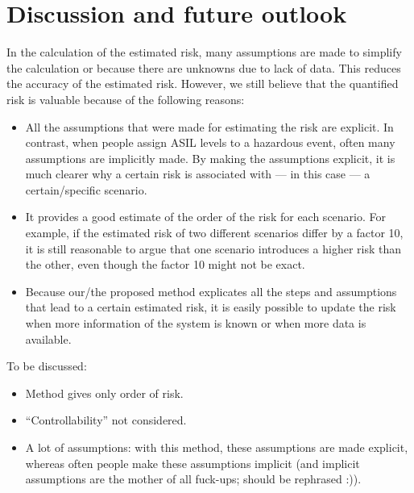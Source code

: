 \section{Discussion and future outlook} %
\label{sec:discussion}

In the calculation of the estimated risk, many assumptions are made to simplify the calculation or because there are unknowns due to lack of data. This reduces the accuracy of the estimated risk. 
However, we still believe that the quantified risk is valuable because of the following reasons:
\begin{itemize}
	\item All the assumptions that were made for estimating the risk are explicit. In contrast, when people assign ASIL levels to a hazardous event, often many assumptions are implicitly made. By making the assumptions explicit, it is much clearer why a certain risk is associated with --- in this case --- a certain/specific scenario.
	\item It provides a good estimate of the order of the risk for each scenario. For example, if the estimated risk of two different scenarios differ by a factor 10, it is still reasonable to argue that one scenario introduces a higher risk than the other, even though the factor 10 might not be exact.
	\item Because our/the proposed method explicates all the steps and assumptions that lead to a certain estimated risk, it is easily possible to update the risk when more information of the system is known or when more data is available.
\end{itemize}

To be discussed:
\begin{itemize}
	\item Method gives only order of risk.
	\item ``Controllability'' not considered.
	\item A lot of assumptions: with this method, these assumptions are made explicit, whereas often people make these assumptions implicit (and implicit assumptions are the mother of all fuck-ups; should be rephrased :)).
\end{itemize}